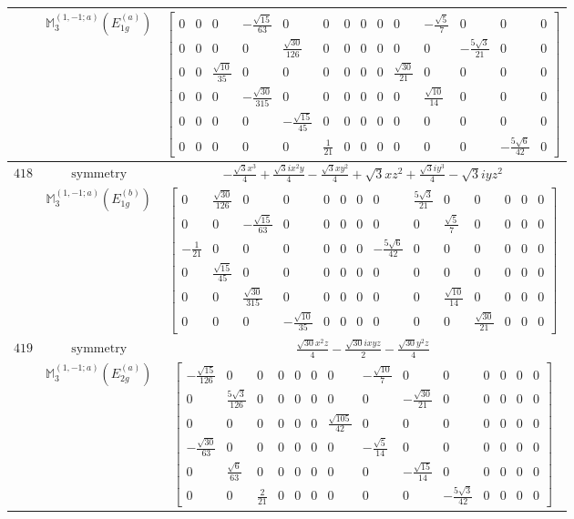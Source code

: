 \documentclass[fleqn,8pt,landscape]{jsarticle}
\begin{document}
\begin{longtable}{ccc}
$  $ & $ \mathbb{M}_{3}^{(1,-1;a)}(E_{1g}^{(a)}) $ & $ \begin{bmatrix} 0 & 0 & 0 & - \frac{\sqrt{15}}{63} & 0 & 0 & 0 & 0 & 0 & 0 & - \frac{\sqrt{5}}{7} & 0 & 0 & 0 \\ 0 & 0 & 0 & 0 & \frac{\sqrt{30}}{126} & 0 & 0 & 0 & 0 & 0 & 0 & - \frac{5 \sqrt{3}}{21} & 0 & 0 \\ 0 & 0 & \frac{\sqrt{10}}{35} & 0 & 0 & 0 & 0 & 0 & 0 & \frac{\sqrt{30}}{21} & 0 & 0 & 0 & 0 \\ 0 & 0 & 0 & - \frac{\sqrt{30}}{315} & 0 & 0 & 0 & 0 & 0 & 0 & \frac{\sqrt{10}}{14} & 0 & 0 & 0 \\ 0 & 0 & 0 & 0 & - \frac{\sqrt{15}}{45} & 0 & 0 & 0 & 0 & 0 & 0 & 0 & 0 & 0 \\ 0 & 0 & 0 & 0 & 0 & \frac{1}{21} & 0 & 0 & 0 & 0 & 0 & 0 & - \frac{5 \sqrt{6}}{42} & 0 \end{bmatrix} $ \\ \hline
$ 418 $ & $ \text{symmetry} $ & $ - \frac{\sqrt{3} x^{3}}{4} + \frac{\sqrt{3} i x^{2} y}{4} - \frac{\sqrt{3} x y^{2}}{4} + \sqrt{3} x z^{2} + \frac{\sqrt{3} i y^{3}}{4} - \sqrt{3} i y z^{2} $ \\
$  $ & $ \mathbb{M}_{3}^{(1,-1;a)}(E_{1g}^{(b)}) $ & $ \begin{bmatrix} 0 & \frac{\sqrt{30}}{126} & 0 & 0 & 0 & 0 & 0 & 0 & \frac{5 \sqrt{3}}{21} & 0 & 0 & 0 & 0 & 0 \\ 0 & 0 & - \frac{\sqrt{15}}{63} & 0 & 0 & 0 & 0 & 0 & 0 & \frac{\sqrt{5}}{7} & 0 & 0 & 0 & 0 \\ - \frac{1}{21} & 0 & 0 & 0 & 0 & 0 & 0 & - \frac{5 \sqrt{6}}{42} & 0 & 0 & 0 & 0 & 0 & 0 \\ 0 & \frac{\sqrt{15}}{45} & 0 & 0 & 0 & 0 & 0 & 0 & 0 & 0 & 0 & 0 & 0 & 0 \\ 0 & 0 & \frac{\sqrt{30}}{315} & 0 & 0 & 0 & 0 & 0 & 0 & \frac{\sqrt{10}}{14} & 0 & 0 & 0 & 0 \\ 0 & 0 & 0 & - \frac{\sqrt{10}}{35} & 0 & 0 & 0 & 0 & 0 & 0 & \frac{\sqrt{30}}{21} & 0 & 0 & 0 \end{bmatrix} $ \\ \hline
$ 419 $ & $ \text{symmetry} $ & $ \frac{\sqrt{30} x^{2} z}{4} - \frac{\sqrt{30} i x y z}{2} - \frac{\sqrt{30} y^{2} z}{4} $ \\
$  $ & $ \mathbb{M}_{3}^{(1,-1;a)}(E_{2g}^{(a)}) $ & $ \begin{bmatrix} - \frac{\sqrt{15}}{126} & 0 & 0 & 0 & 0 & 0 & 0 & - \frac{\sqrt{10}}{7} & 0 & 0 & 0 & 0 & 0 & 0 \\ 0 & \frac{5 \sqrt{3}}{126} & 0 & 0 & 0 & 0 & 0 & 0 & - \frac{\sqrt{30}}{21} & 0 & 0 & 0 & 0 & 0 \\ 0 & 0 & 0 & 0 & 0 & 0 & \frac{\sqrt{105}}{42} & 0 & 0 & 0 & 0 & 0 & 0 & 0 \\ - \frac{\sqrt{30}}{63} & 0 & 0 & 0 & 0 & 0 & 0 & - \frac{\sqrt{5}}{14} & 0 & 0 & 0 & 0 & 0 & 0 \\ 0 & \frac{\sqrt{6}}{63} & 0 & 0 & 0 & 0 & 0 & 0 & - \frac{\sqrt{15}}{14} & 0 & 0 & 0 & 0 & 0 \\ 0 & 0 & \frac{2}{21} & 0 & 0 & 0 & 0 & 0 & 0 & - \frac{5 \sqrt{3}}{42} & 0 & 0 & 0 & 0 \end{bmatrix} $ \\ \hline

\end{longtable}
\end{document}
